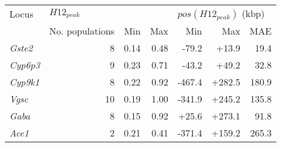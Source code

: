 \begin{tabular}{lrrrrrr}
\toprule
           Locus & \multicolumn{3}{l}{$H12_{peak}$} & \multicolumn{3}{l}{$pos(H12_{peak})$ (kbp)} \\
                 & No. populations &  Min &  Max &                     Min &    Max &   MAE \\
\midrule
  \textit{Gste2} &               8 & 0.14 & 0.48 &                   -79.2 &  +13.9 &  19.4 \\
 \textit{Cyp6p3} &               9 & 0.23 & 0.71 &                   -43.2 &  +49.2 &  32.8 \\
 \textit{Cyp9k1} &               8 & 0.22 & 0.92 &                  -467.4 & +282.5 & 180.9 \\
   \textit{Vgsc} &              10 & 0.19 & 1.00 &                  -341.9 & +245.2 & 135.8 \\
   \textit{Gaba} &               8 & 0.15 & 0.92 &                   +25.6 & +273.1 &  91.8 \\
   \textit{Ace1} &               2 & 0.21 & 0.41 &                  -371.4 & +159.2 & 265.3 \\
\bottomrule
\end{tabular}
